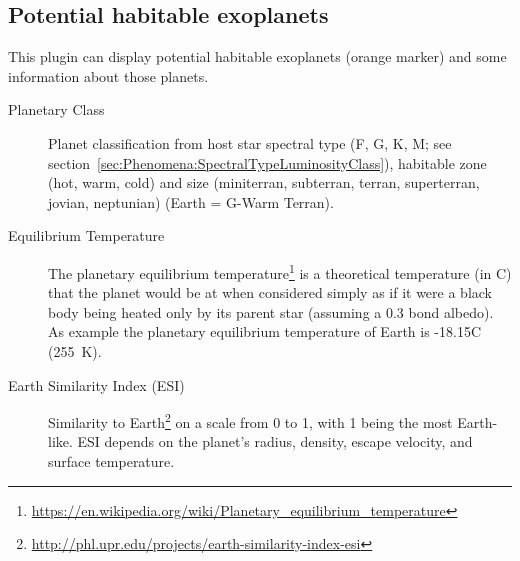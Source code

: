 \subsection{Potential habitable exoplanets}
\label{sec:plugins:Exoplanets:habitable}
This plugin can display potential habitable exoplanets (orange marker) and some information about those planets.

\begin{description}
\item[Planetary Class] Planet classification from host star spectral
  type (F, G, K, M; see
  section~\ref{sec:Phenomena:SpectralTypeLuminosityClass}), habitable
  zone (hot, warm, cold) and size (miniterran, subterran, terran,
  superterran, jovian, neptunian) (Earth = G-Warm Terran).
\item[Equilibrium Temperature] The planetary equilibrium
  temperature\footnote{\url{https://en.wikipedia.org/wiki/Planetary_equilibrium_temperature}}
  is a theoretical temperature (in \degree C) that the planet would be
  at when considered simply as if it were a black body being heated
  only by its parent star (assuming a 0.3 bond albedo). As example the
  planetary equilibrium temperature of Earth is -18.15\degree C (255~K).
\item[Earth Similarity Index (ESI)] Similarity to
  Earth\footnote{\url{http://phl.upr.edu/projects/earth-similarity-index-esi}}
  on a scale from 0 to 1, with 1 being the most Earth-like. ESI
  depends on the planet's radius, density, escape velocity, and
  surface temperature.
\end{description}

